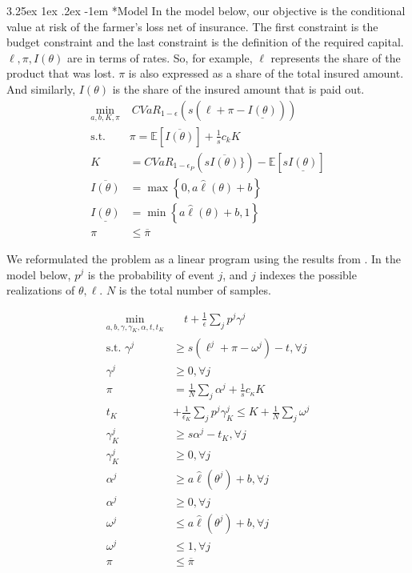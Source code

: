 \documentclass[11pt]{article}
\makeatletter
\renewcommand\paragraph{\@startsection{paragraph}{5}{\z@}%
  {3.25ex \@plus1ex \@minus.2ex}%
  {-1em}%
  {\normalfont\normalsize\bfseries}}
\makeatother
\begin{document}
    \paragraph*{Model}
    In the model below, our objective is the conditional value at risk of the farmer's loss net of insurance. The first constraint is the budget constraint and the last constraint is the definition of the required capital. $\ell, \pi, I(\theta)$ are in terms of rates. So, for example, $\ell$ represents the share of the product that was lost. $\pi$ is also expressed as a share of the total insured amount. And similarly, $I(\theta)$ is the share of the insured amount that is paid out. 
    \begin{align}
      \min_{a,b,K,\pi} &\ CVaR_{1-\epsilon}\left(s(\ell + \pi  -  \underline{I(\theta)} )\right)\\
      \text{s.t.   } & \pi = \mathbb{E} \left [ \overline{I(\theta)} \right ] + \frac{1}{s}c_k K\\
      K &= CVaR_{1-\epsilon_P} \left( s\overline{I(\theta)} \} \right) - \mathbb{E}\left [ s\underline{I(\theta)} \right ]\\
      \overline{I(\theta)} &= \max \left \{0,a\hat{\ell}(\theta) + b \right \}\\
      \underline{I(\theta)} &= \min \left \{a\hat{\ell}(\theta)+b,1 \right \}\\
      \pi &\leq \overline{\pi}
  \end{align}
  
    We reformulated the problem as a linear program  using the results from \cite{rockafellar2000optimization}. In the model below, $p^j$ is the probability of event $j$, and $j$ indexes the possible realizations of $\theta, \ell$. $N$ is the total number of samples. 
    
    \begin{align}
        \min_{a,b,\gamma,\gamma_K,\alpha,t,t_K} &\quad t + \frac{1}{\epsilon}\sum_j p^j \gamma^j\\
        \text{s.t.   } \gamma^j &\geq s(\ell^j + \pi - \omega^j)  - t, \forall j\\
        \gamma^j &\geq 0, \forall j \\
          \pi &= \frac{1}{N}\sum_j \alpha^j + \frac{1}{s} c_{\kappa} K\\
          t_K &+ \frac{1}{\epsilon_K} \sum_j p^j \gamma_K^j \leq K+ \frac{1}{N}\sum_j \omega^j \\
          \gamma_K^j &\geq s\alpha^j -t_K, \forall j \\
          \gamma_K^j &\geq 0, \forall j\\
          \alpha^j &\geq a \hat{\ell}(\theta^j) + b, \forall j\\
          \alpha^j &\geq 0, \forall j\\
          \omega^j &\leq a \hat{\ell}(\theta^j) + b, \forall j\\
          \omega^j &\leq 1, \forall j\\
          \pi &\leq \overline{\pi}
    \end{align}
      
\end{document}
